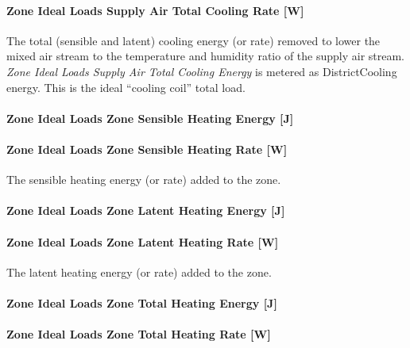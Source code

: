 \paragraph{Zone Ideal Loads Supply Air Total Cooling Rate {[}W{]}}\label{zone-ideal-loads-supply-air-total-cooling-rate-w}

The total (sensible and latent) cooling energy (or rate) removed to lower the mixed air stream to the temperature and humidity ratio of the supply air stream. \emph{Zone Ideal Loads Supply Air Total Cooling Energy} is metered as DistrictCooling energy. This is the ideal ``cooling coil'' total load.

\paragraph{Zone Ideal Loads Zone Sensible Heating Energy {[}J{]}}\label{zone-ideal-loads-zone-sensible-heating-energy-j}

\paragraph{Zone Ideal Loads Zone Sensible Heating Rate {[}W{]}}\label{zone-ideal-loads-zone-sensible-heating-rate-w}

The sensible heating energy (or rate) added to the zone.

\paragraph{Zone Ideal Loads Zone Latent Heating Energy {[}J{]}}\label{zone-ideal-loads-zone-latent-heating-energy-j}

\paragraph{Zone Ideal Loads Zone Latent Heating Rate {[}W{]}}\label{zone-ideal-loads-zone-latent-heating-rate-w}

The latent heating energy (or rate) added to the zone.

\paragraph{Zone Ideal Loads Zone Total Heating Energy {[}J{]}}\label{zone-ideal-loads-zone-total-heating-energy-j}

\paragraph{Zone Ideal Loads Zone Total Heating Rate {[}W{]}}\label{zone-ideal-loads-zone-total-heating-rate-w}

